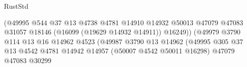 \begin{lexlean}{RustStd}
\begin{coremodule}
                                                            (@49995
                                                              @544
                                                              @37
                                                              @13
                                                              @4738
                                                              @4781
                                                              @14910
                                                              @14932
                                                              @50013
                                                              @47079
                                                              @47083
                                                              @31057
                                                              @18146
                                                              (@16099 (@19629 @14932 @14911))
                                                              @16249))
                                                          (@49979
                                                            @3790
                                                            @114
                                                            @13
                                                            @16
                                                            @14962
                                                            @4523
                                                            (@49987
                                                              @3790
                                                              @13
                                                              @14962
                                                              (@49995
                                                                @305
                                                                @37
                                                                @13
                                                                @4542
                                                                @4781
                                                                @14942
                                                                @14957
                                                                (@50007 @4542 @50011 @16298)
                                                                @47079
                                                                @47083
                                                                @30299

\end{coremodule}
\end{lexlean}
